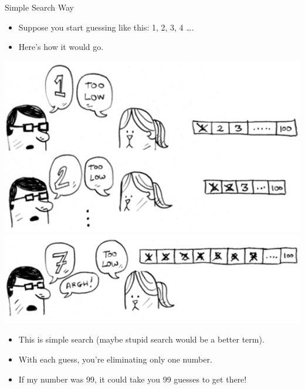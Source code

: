 \documentclass[ignorenonframetext,]{beamer}
\providecommand{\tightlist}{%
  \setlength{\itemsep}{0pt}\setlength{\parskip}{0pt}}
\begin{document}
\begin{frame}{Simple Search Way}
\protect\hypertarget{simple-search-way}{}

\begin{itemize}
\tightlist
\item
  Suppose you start guessing like this: 1, 2, 3, 4 \ldots{}.
\item
  Here's how it would go.
\end{itemize}

\includegraphics{./Chapter01-figure/simple_search_01.png}
\includegraphics{./Chapter01-figure/simple_search_02.png}

\begin{itemize}
\tightlist
\item
  This is simple search (maybe stupid search would be a better term).
\item
  With each guess, you're eliminating only one number.
\item
  If my number was 99, it could take you 99 guesses to get there!
\end{itemize}

\end{frame}
\end{document}
